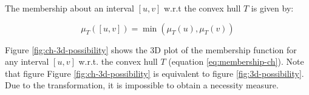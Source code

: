\documentclass[twoside,twocolumn,a4paper]{article}
\newcommand{\Pos}{\operatorname{Pos}}
\newcommand{\Nec}{\operatorname{Nec}}
\begin{document}





The membership about an interval $[u,v]$ w.r.t the convex hull $T$ is given by:

\begin{equation}
\label{eq:membership-ch}
\mu_T([u,v]) = \min \left( \mu_T\left(u\right), \mu_T\left(v\right)\right)
\end{equation}


Figure \ref{fig:ch-3d-possibility} shows the 3D plot of the membership function for any interval $[u,v]$ w.r.t. the convex hull $T$ (equation \eqref{eq:membership-ch}). Note that figure Figure \ref{fig:ch-3d-possibility} is equivalent to figure \ref{fig:3d-possibility}. Due to the transformation, it is impossible to obtain a necessity measure.
\end{document}

